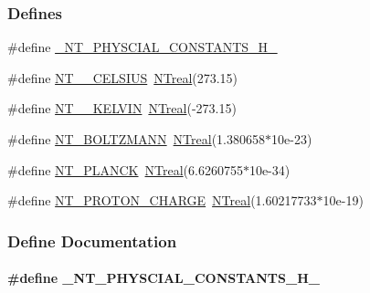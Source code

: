 \subsubsection*{Defines}
\begin{DoxyCompactItemize}
\item 
\#define \hyperlink{nt__physical__constants_8h_a41f6d2151bb90c96e11e909642c26f6f}{\_\-NT\_\-PHYSCIAL\_\-CONSTANTS\_\-H\_\-}
\item 
\#define \hyperlink{nt__physical__constants_8h_a8b4ddb21167b8f846bf05006640d8e58}{NT\_\_\-CELSIUS}~\hyperlink{nt__types_8h_a814a97893e9deb1eedcc7604529ba80d}{NTreal}(273.15)
\item 
\#define \hyperlink{nt__physical__constants_8h_ae95e2529f943f729e9db23340a3fba07}{NT\_\_\-KELVIN}~\hyperlink{nt__types_8h_a814a97893e9deb1eedcc7604529ba80d}{NTreal}(-\/273.15)
\item 
\#define \hyperlink{nt__physical__constants_8h_abe64d4124212752c40dd8c96ba43cdfd}{NT\_\-BOLTZMANN}~\hyperlink{nt__types_8h_a814a97893e9deb1eedcc7604529ba80d}{NTreal}(1.380658$\ast$10e-\/23)
\item 
\#define \hyperlink{nt__physical__constants_8h_a6310537ab525b43c6e3771c88afe1036}{NT\_\-PLANCK}~\hyperlink{nt__types_8h_a814a97893e9deb1eedcc7604529ba80d}{NTreal}(6.6260755$\ast$10e-\/34)
\item 
\#define \hyperlink{nt__physical__constants_8h_a5365829057a622adb8029986a2bb103e}{NT\_\-PROTON\_\-CHARGE}~\hyperlink{nt__types_8h_a814a97893e9deb1eedcc7604529ba80d}{NTreal}(1.60217733$\ast$10e-\/19)
\end{DoxyCompactItemize}


\subsubsection{Define Documentation}
\paragraph[{\_\-NT\_\-PHYSCIAL\_\-CONSTANTS\_\-H\_\-}]{\setlength{\rightskip}{0pt plus 5cm}\#define \_\-NT\_\-PHYSCIAL\_\-CONSTANTS\_\-H\_\-}\hfill\label{nt__physical__constants_8h_a41f6d2151bb90c96e11e909642c26f6f}


